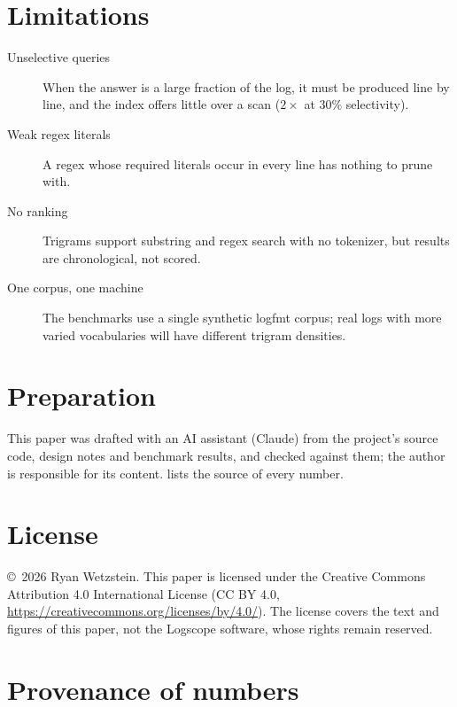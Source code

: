 \documentclass[11pt]{article}
\theoremstyle{plain}
\theoremstyle{definition}
\theoremstyle{remark}
\begin{document}
\section{Limitations}\label{sec:limits}

\begin{description}
  \item[Unselective queries] When the answer is a large fraction of the log, it
        must be produced line by line, and the index offers little over a scan
        ($2\times$ at $30\%$ selectivity).
  \item[Weak regex literals] A regex whose required literals occur in every
        line has nothing to prune with.
  \item[No ranking] Trigrams support substring and regex search with no
        tokenizer, but results are chronological, not scored.
  \item[One corpus, one machine] The benchmarks use a single synthetic logfmt
        corpus; real logs with more varied vocabularies will have different
        trigram densities.
\end{description}

\section*{Preparation}

This paper was drafted with an AI assistant (Claude) from the project's source
code, design notes and benchmark results, and checked against them; the author
is responsible for its content.  lists the source of every
number.

\section*{License}

\copyright\ 2026 Ryan Wetzstein. This paper is licensed under the Creative
Commons Attribution 4.0 International License (CC BY 4.0,
\url{https://creativecommons.org/licenses/by/4.0/}). The license covers the
text and figures of this paper, not the Logscope software, whose rights remain
reserved.

\appendix
\section{Provenance of numbers}\label{app:provenance}
\end{document}

